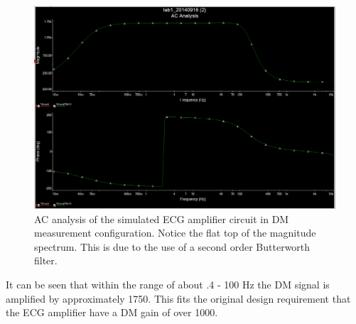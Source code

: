 \documentclass[pdftex,12pt,letterpaper]{article}
\begin{document}
\begin{figure}[H]
\begin{center}
\includegraphics[scale=.35]{DM_analysis.png}
\caption{AC analysis of the simulated ECG amplifier circuit in DM measurement configuration. Notice the flat top of the magnitude spectrum. This is due to the use of a second order Butterworth filter.}
\label{fig:DM}
\end{center}
\end{figure}

It can be seen that within the range of about .4 - 100 Hz the DM signal is amplified by approximately 1750. This fits the original design requirement that the ECG amplifier have a DM gain of over 1000.
\end{document}
